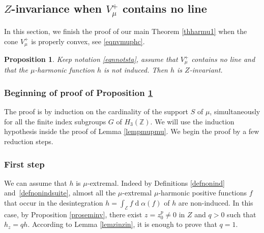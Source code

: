\documentclass[JEP,XML,SOM,Unicode]{cedram}
\let\mathcal\mathscr
\DeclareMathOperator{\rd}{d}
\newtheorem{Prop}[Thm]{Proposition}
\theoremstyle{definition}
\newcommand{\m}[1]{\mathbb{ #1}}
\newcommand{\mc}[1]{\mathcal{ #1}}
\let\al\alpha
\let\bq\relax
\let\eq\relax
\begin{document}
\subsection{$Z$-invariance when $V^+_\mu$ contains no line}
\label{secvmunol}

\bq
In this section, we finish the proof of our main Theorem
\ref{thharmu1}
when the cone $V_\mu^+$ is properly convex, see \eqref{eqnvmuphc}.
\eq

\begin{Prop}

\label{provmunol}
Keep notation \eqref{eqnnotsta}, assume that
$V^+_\mu$ contains no line
and that the $\mu$-harmonic function $h$ is not induced.
Then $h$ is $Z$-invariant.
\end{Prop}

\subsubsection*{Beginning of proof of Proposition \ref{provmunol}}
The proof is by induction on the cardinality of the support $S$ of $\mu$,
simultaneously for all the finite index subgroups $G$ of $H_3(\m Z)$.
We will use the induction hypothesis inside the proof of Lemma \ref{lempmupmu}. We begin the proof by a few reduction steps.

\subsubsection*{First step}
We can assume that $h$ is $\mu$-extremal.
Indeed by Definitions \ref{defnonind} and~\ref{defnonindsuite},
almost all the $\mu$-extremal $\mu$-harmonic positive functions $f$
that occur in the desintegration $h=\int_{\mc E}f\rd \al (f)$ of $h$
are non-induced.
In this case,
by Proposition \ref{proseminv}, there exist $z=z_0^p\neq 0$ in $Z$ and $q>0$
such that $h_z=qh$.
According to Lemma \ref{lemzinzin}, it is enough to prove that $q=1$.
\end{document}
